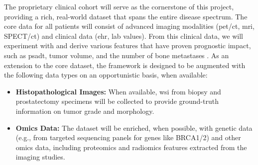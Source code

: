 \documentclass[11pt, a4paper]{article}
\begin{document}
The proprietary clinical cohort will serve as the cornerstone of this project, providing a rich, real-world dataset that spans the entire disease spectrum. The core data for all patients will consist of advanced imaging modalities (\gls{pet}/\gls{ct}, \gls{mri}, SPECT/\gls{ct}) and clinical data (\gls{ehr}, lab values). From this clinical data, we will experiment with and derive various features that have proven prognostic impact, such as \gls{psadt}, tumor volume, and the number of bone metastases \cite{guidelines_uro_1,guidelines_uro_2}. As an extension to the core dataset, the framework is designed to be augmented with the following data types on an opportunistic basis, when available:

\begin{itemize}
    \item \textbf{Histopathological Images:} When available, \gls{wsi} from biopsy and prostatectomy specimens will be collected to provide ground-truth information on tumor grade and morphology.
    \item \textbf{Omics Data:} The dataset will be enriched, when possible, with genetic data (e.g., from targeted sequencing panels for genes like BRCA1/2) and other omics data, including proteomics and radiomics features extracted from the imaging studies.
\end{itemize}
\end{document}
